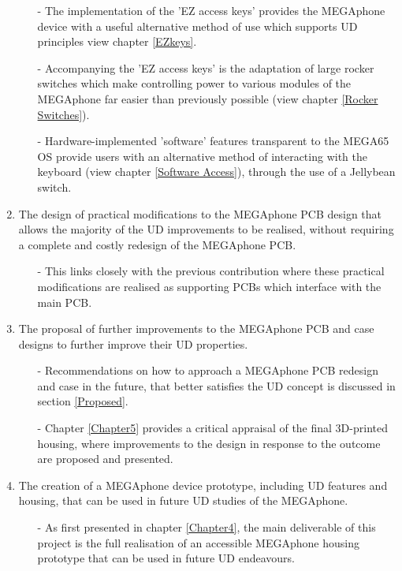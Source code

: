 \begin{enumerate}
\begin{enumerate}
        \item[-] The implementation of the 'EZ access keys' provides the MEGAphone device with a useful alternative method of use which supports UD principles {view chapter \ref{EZkeys}}.
        \item[-] Accompanying the 'EZ access keys' is the adaptation of large rocker switches which make controlling power to various modules of the MEGAphone far easier than previously possible (view chapter \ref{Rocker Switches}).
        \item[-] Hardware-implemented 'software' features transparent to the MEGA65 OS provide users with an alternative method of interacting with the keyboard (view chapter \ref{Software Access}), through the use of a Jellybean switch.
        \end{enumerate} 
    \item The design of practical modifications to the MEGAphone PCB design that allows the majority of the UD improvements to be realised, without requiring a complete and costly redesign of the MEGAphone PCB.
        \begin{enumerate}
        \item[-] This links closely with the previous contribution where these practical modifications are realised as supporting PCBs which interface with the main PCB.
        \end{enumerate} 
    \item The proposal of further improvements to the MEGAphone PCB and case designs to further improve their UD properties.
        \begin{enumerate}
        \item[-] Recommendations on how to approach a MEGAphone PCB redesign and case in the future, that better satisfies the UD concept is discussed in section \ref{Proposed}.
        \item[-] Chapter \ref{Chapter5} provides a critical appraisal of the final 3D-printed housing, where improvements to the design in response to the outcome are proposed and presented.
        \end{enumerate} 
    \item The creation of a MEGAphone device prototype, including UD features and housing, that can be used in future UD studies of the MEGAphone.
        \begin{enumerate}
        \item[-] As first presented in chapter \ref{Chapter4}, the main deliverable of this project is the full realisation of an accessible MEGAphone housing prototype that can be used in future UD endeavours.
        \end{enumerate}
\end{enumerate}

